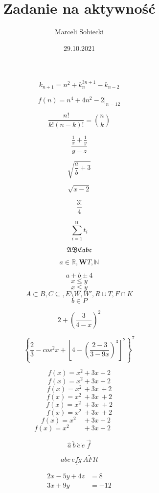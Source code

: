 \documentclass[12pt,legalpaper,notitlepage]{article}
\title{Zadanie na aktywność}
\author{Marceli Sobiecki}
\date{29.10.2021}
\begin{document}
\maketitle

$$k_{n+1}= n^2+k^{3n+1}_n-k_{n-2}$$

$$f(n)=n^4+4n^2-2|_{n=12}$$

$$\frac {n!} {k!(n-k)!}=\binom{n}{k}$$

$$\frac {\frac {1} {x}+ \frac {1}{y}} {y-z}$$

$$\sqrt {\frac {a} {b} + 3}$$

$$\sqrt {x-2}$$

$$\frac {3!} {4}$$

$$\sum_{i=1}^{10} t_i$$

$$\mathfrak{ABCabc}$$

$$ a\in \mathbb{R}, \mathbf{W} T,\mathbb{N} $$

$$a+b\pm 4$$
$$x\leq y$$
$$x \leqslant y$$
$$A\subset B, C \subseteq , E \setminus W, W', R \cup T, F \cap K$$
$$b \in P$$



$$2+\left(\frac{3}{4-x}\right)^2$$

$$\left\{\frac {2}{3}-cos^2x+\left[4-\left(\frac{2-3}{3-9x}\right)^3\right]^2\right\}^7$$

$$f(x) = x^2\! +3x\! +2 $$
$$f(x) = x^2 + 3x+2 $$
$$f(x) = x^2\, +3x\, +2 $$
$$f(x) = x^2\: + 3x\: +2 $$
$$f(x) = x^2\; + 3x\; +2 $$
$$f(x) = x^2\ +3x\ +2 $$
$$f(x) = x^2\quad + 3x+2\quad $$
$$f(x) = x^2\qquad + 3x+2\qquad $$

$$\hat{a} \ \check{b} \ \acute{c} \ \dot{e} \ \vec{f}$$

$$\overline{abc}\ \underline{efg}\ \widetilde{AFR}$$

\begin{align*}
2x -5y +4z &= 8\\
3x + 9y &= -12
\end{align*}
\end{document}
